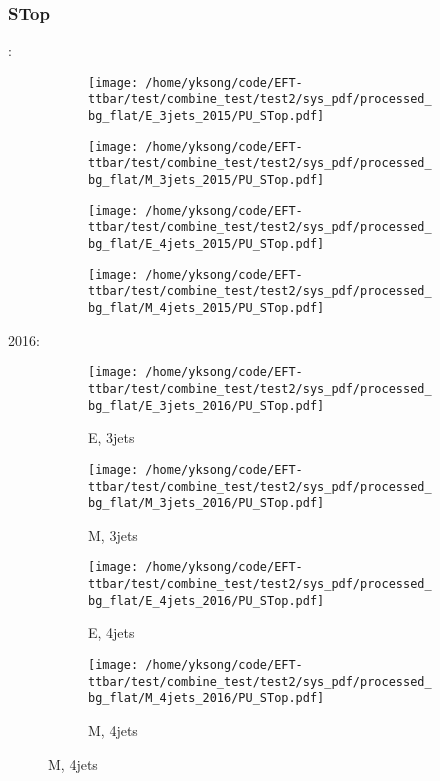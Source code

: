 \documentclass{beamer}
\begin{document}
\begin{frame}
\frametitle{STop}
\fontsize{5}{1}:
\begin{figure}
\centering
\begin{subfigure}[b]{0.24\textwidth}
\texttt{[image: /home/yksong/code/EFT-ttbar/test/combine\_test/test2/sys\_pdf/processed\_bg\_flat/E\_3jets\_2015/PU\_STop.pdf]}
\end{subfigure}
\begin{subfigure}[b]{0.24\textwidth}
\texttt{[image: /home/yksong/code/EFT-ttbar/test/combine\_test/test2/sys\_pdf/processed\_bg\_flat/M\_3jets\_2015/PU\_STop.pdf]}
\end{subfigure}
\begin{subfigure}[b]{0.24\textwidth}
\texttt{[image: /home/yksong/code/EFT-ttbar/test/combine\_test/test2/sys\_pdf/processed\_bg\_flat/E\_4jets\_2015/PU\_STop.pdf]}
\end{subfigure}
\begin{subfigure}[b]{0.24\textwidth}
\texttt{[image: /home/yksong/code/EFT-ttbar/test/combine\_test/test2/sys\_pdf/processed\_bg\_flat/M\_4jets\_2015/PU\_STop.pdf]}
\end{subfigure}
\end{figure}
2016:
\begin{figure}
\centering
\begin{subfigure}[b]{0.24\textwidth}
\texttt{[image: /home/yksong/code/EFT-ttbar/test/combine\_test/test2/sys\_pdf/processed\_bg\_flat/E\_3jets\_2016/PU\_STop.pdf]}
\captionsetup{font=tiny}
\caption{E, 3jets}
\end{subfigure}
\begin{subfigure}[b]{0.24\textwidth}
\texttt{[image: /home/yksong/code/EFT-ttbar/test/combine\_test/test2/sys\_pdf/processed\_bg\_flat/M\_3jets\_2016/PU\_STop.pdf]}
\captionsetup{font=tiny}
\caption{M, 3jets}
\end{subfigure}
\begin{subfigure}[b]{0.24\textwidth}
\texttt{[image: /home/yksong/code/EFT-ttbar/test/combine\_test/test2/sys\_pdf/processed\_bg\_flat/E\_4jets\_2016/PU\_STop.pdf]}
\captionsetup{font=tiny}
\caption{E, 4jets}
\end{subfigure}
\begin{subfigure}[b]{0.24\textwidth}
\texttt{[image: /home/yksong/code/EFT-ttbar/test/combine\_test/test2/sys\_pdf/processed\_bg\_flat/M\_4jets\_2016/PU\_STop.pdf]}
\captionsetup{font=tiny}
\caption{M, 4jets}
\end{subfigure}
\end{figure}
\end{frame}
\end{document}
